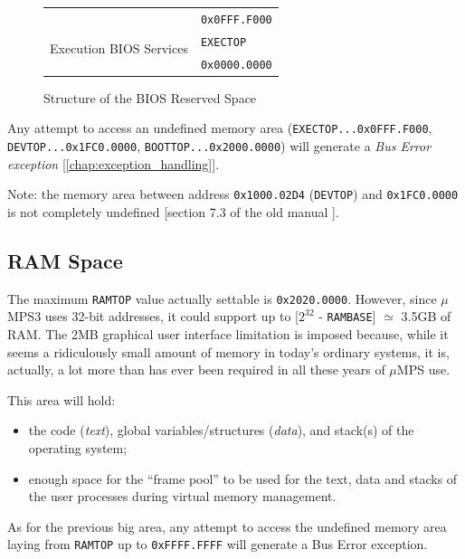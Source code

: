 \documentclass[12pt,a4paper,openright,twoside]{report}
\begin{document}
\begin{figure}[ht]
\begin{tabular}{cl}
		\multicolumn{1}{|c|}{}                                              & \multirow{2}{*}{\texttt{0x0FFF.F000}} \\ \hhline{-~}
		\multicolumn{1}{|l|}{\multirow{2}{*}{\cellcolor{gray}}}             &                                       \\ [-3ex]
		\multicolumn{1}{|l|}{\cellcolor{gray}}                              & \multirow{2}{*}{\texttt{EXECTOP}}     \\ \cline{1-1}
		\multicolumn{1}{|c|}{\multirow{2}{*}{Execution BIOS Services}}      &                                       \\ [-1ex]
		\multicolumn{1}{|c|}{}                                              & \multirow{2}{*}{\texttt{0x0000.0000}} \\ \cline{1-1}
		\multicolumn{1}{l}{}                                                &
	\end{tabular}
	\caption{Structure of the BIOS Reserved Space}
	\label{fig:kernel_reserved_space}
\end{figure}
Any attempt to access an undefined memory area (\texttt{EXECTOP...0x0FFF.F000}, \texttt{DEVTOP...0x1FC0.0000}, \texttt{BOOTTOP...0x2000.0000}) will generate a \textit{Bus Error exception} [\autoref{chap:exception_handling}].

Note: the memory area between address \texttt{0x1000.02D4} (\texttt{DEVTOP}) and \texttt{0x1FC0.0000} is not completely undefined [section 7.3 of the old manual \cite{old_pops}].

\subsection{RAM Space}
The maximum \texttt{RAMTOP} value actually settable is \texttt{0x2020.0000}.
However, since $\mu$MPS3 uses 32-bit addresses, it could support up to [$2^{32}$ - \texttt{RAMBASE}] $\simeq$ 3.5GB of RAM.
The 2MB graphical user interface limitation is imposed because, while it seems a ridiculously small amount of memory in today's ordinary systems, it is, actually, a lot more than has ever been required in all these years of $\mu$MPS use.

This area will hold:
\begin{itemize}
	\item the code (\textit{text}), global variables/structures (\textit{data}), and stack(s) of the operating system;
	\item enough space for the ``frame pool'' to be used for the text, data and stacks of the user processes during virtual memory management.
\end{itemize}
As for the previous big area, any attempt to access the undefined memory area laying from \texttt{RAMTOP} up to \texttt{0xFFFF.FFFF} will generate a Bus Error exception.
\end{document}
